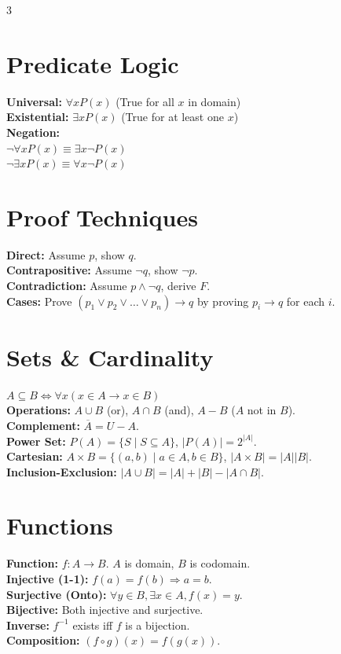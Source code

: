 \documentclass[10pt]{article}
\begin{document}
\begin{multicols}{3}
\section{Predicate Logic}
\textbf{Universal:} $\forall x P(x)$ (True for all $x$ in domain) \\
\textbf{Existential:} $\exists x P(x)$ (True for at least one $x$) \\
\textbf{Negation:} \\
$\neg \forall x P(x) \equiv \exists x \neg P(x)$ \\
$\neg \exists x P(x) \equiv \forall x \neg P(x)$

\section{Proof Techniques}
\textbf{Direct:} Assume $p$, show $q$. \\
\textbf{Contrapositive:} Assume $\neg q$, show $\neg p$. \\
\textbf{Contradiction:} Assume $p \land \neg q$, derive $F$. \\
\textbf{Cases:} Prove $(p_1 \lor p_2 \lor \dots \lor p_n) \rightarrow q$ by proving $p_i \rightarrow q$ for each $i$.

\section{Sets \& Cardinality}
$A \subseteq B \iff \forall x(x \in A \rightarrow x \in B)$ \\
\textbf{Operations:} $A \cup B$ (or), $A \cap B$ (and), $A - B$ ($A$ not in $B$). \\
\textbf{Complement:} $\overline{A} = U - A$. \\
\textbf{Power Set:} $P(A) = \{S \mid S \subseteq A\}$, $|P(A)| = 2^{|A|}$. \\
\textbf{Cartesian:} $A \times B = \{(a,b) \mid a \in A, b \in B\}$, $|A \times B| = |A||B|$. \\
\textbf{Inclusion-Exclusion:} $|A \cup B| = |A| + |B| - |A \cap B|$.

\section{Functions}
\textbf{Function:} $f: A \to B$. $A$ is domain, $B$ is codomain. \\
\textbf{Injective (1-1):} $f(a) = f(b) \Rightarrow a = b$. \\
\textbf{Surjective (Onto):} $\forall y \in B, \exists x \in A, f(x) = y$. \\
\textbf{Bijective:} Both injective and surjective. \\
\textbf{Inverse:} $f^{-1}$ exists iff $f$ is a bijection. \\
\textbf{Composition:} $(f \circ g)(x) = f(g(x))$.


\end{multicols}
\end{document}
